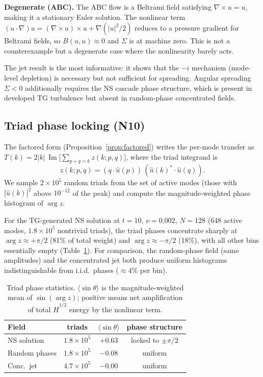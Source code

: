 \documentclass[11pt]{article}
\theoremstyle{definition}
\newcommand{\Hdot}[1]{\dot{H}^{#1}}
\DeclareMathOperator{\im}{Im}
\begin{document}
\medskip\noindent\textbf{Degenerate (ABC).}
The ABC flow is a Beltrami field satisfying
$\nabla\times u=u$, making it a stationary Euler solution.
The nonlinear term $(u\cdot\nabla)u = (\nabla\times u)
\times u + \nabla(|u|^2/2)$ reduces to a pressure gradient
for Beltrami fields, so $B(u,u)\approx 0$ and $\Sigma$
is at machine zero.  This is not a counterexample but
a degenerate case where the nonlinearity barely acts.

\medskip
The jet result is the most informative: it shows that
the $-i$ mechanism (mode-level depletion) is necessary
but not sufficient for spreading.  Angular spreading
$\Sigma<0$ additionally requires the NS cascade phase
structure, which is present in developed TG turbulence
but absent in random-phase concentrated fields.


\subsection{Triad phase locking (N10)}
\label{sec:triad-phase}

The factored form (Proposition~\ref{prop:factored}) writes
the per-mode transfer as
$T(k) = 2|k|\,\im\bigl[\sum_{p+q=k}z(k;p,q)\bigr]$,
where the triad integrand is
\begin{equation}\label{eq:triad-integrand}
z(k;p,q) = (q\cdot\hat u(p))\,
(\hat u(k)^*\cdot\hat u(q)).
\end{equation}
We sample $2\times 10^5$ random triads from the set of
active modes (those with $|\hat u(k)|^2$ above $10^{-12}$
of the peak) and compute the magnitude-weighted phase
histogram of $\arg z$.

For the TG-generated NS solution at $t=10$,
$\nu=0.002$, $N=128$ (648 active modes,
$1.8\times 10^5$ nontrivial triads), the triad phases
concentrate sharply at $\arg z \approx +\pi/2$ (81\%
of total weight) and $\arg z\approx -\pi/2$ (18\%),
with all other bins essentially empty
(Table~\ref{tab:triad-phase}).  For comparison, the
random-phase field (same amplitudes) and the
concentrated jet both produce uniform histograms
indistinguishable from i.i.d.\ phases
($\approx 4\%$ per bin).

\begin{table}[h]
\centering
\caption{Triad phase statistics.
$\langle\sin\theta\rangle$ is the magnitude-weighted
mean of $\sin(\arg z)$; positive means net amplification
of total $\Hdot{1/2}$ energy by the nonlinear term.}
\label{tab:triad-phase}
\begin{tabular}{@{}lccc@{}}
\toprule
Field & triads & $\langle\sin\theta\rangle$
  & phase structure \\
\midrule
NS solution    & $1.8\times 10^5$ & $+0.63$
  & locked to $\pm\pi/2$ \\
Random phases  & $1.8\times 10^5$ & $-0.08$
  & uniform \\
Conc.\ jet     & $4.7\times 10^5$ & $-0.00$
  & uniform \\
\bottomrule
\end{tabular}
\end{table}
\end{document}
